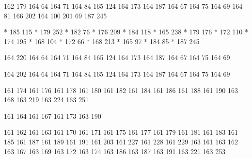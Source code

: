   162 179
  164  64
  164  71
  164  84
  165 124
  164 173
  164 187
  164  67
  164  75
  164  69
  164  81
  166 202
  164 100
  201  69
  187 245

* 185 115
* 179 252
* 182  76
* 176 209
* 184 118
* 165 238
* 179 176
* 172 110
* 174 195
* 168 104
* 172  66
* 168 213
* 165  97
* 184  85
* 187 245

  164 220
  164  64
  164  71
  164  84
  165 124
  164 173
  164 187
  164  67
  164  75
  164  69
       
  164 202
  164  64
  164  71
  164  84
  165 124
  164 173
  164 187
  164  67
  164  75
  164  69

\stopencoding

\startencoding[gbk]

 161 174
 161 176
 161 178
 161 180
 161 182
 161 184
 161 186
 161 188
 161 190
 163 168
 163 219
 163 224
 163 251

 161 164
 161 167
 161 173
 163 190

 161 162
 161 163
 161 170
 161 171
 161 175
 161 177
 161 179
 161 181
 161 183
 161 185
 161 187
 161 189
 161 191
 161 203
 161 227
 161 228
 161 229
 163 161
 163 162
 163 167
 163 169
 163 172
 163 174
 163 186
 163 187
 163 191
 163 221
 163 253

